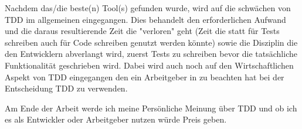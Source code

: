 Nachdem das/die beste(n) Tool(s) gefunden wurde, wird auf die schwächen von TDD
im allgemeinen eingegangen. Dies behandelt den erforderlichen Aufwand und die
daraus resultierende Zeit die "verloren" geht (Zeit die statt für Tests
schreiben auch für Code schreiben genutzt werden könnte) sowie die Disziplin
die den Entwicklern abverlangt wird, zuerst Tests zu schreiben bevor die
tatsächliche Funktionalität geschrieben wird. Dabei wird auch noch auf den
Wirtschaftlichen Aspekt von TDD eingegangen den ein Arbeitgeber in zu beachten
hat bei der Entscheidung TDD zu verwenden.

Am Ende der Arbeit werde ich meine Persönliche Meinung über TDD und ob ich es
als Entwickler oder Arbeitgeber nutzen würde Preis geben.
